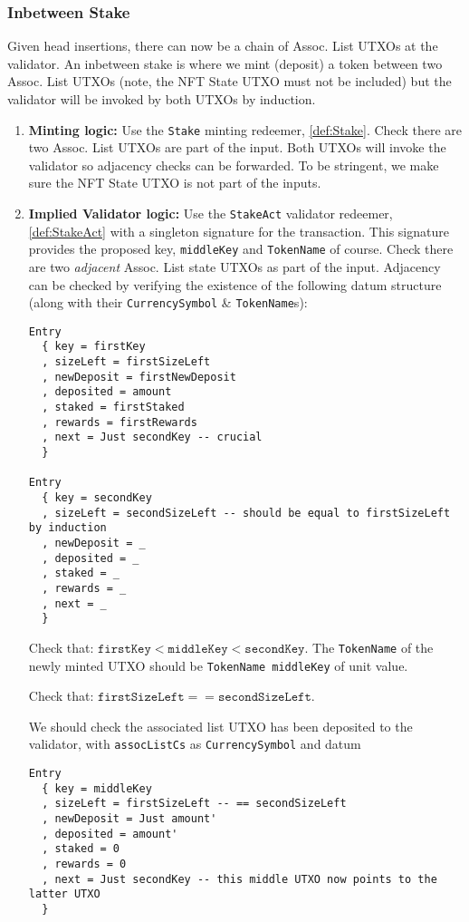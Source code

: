 \documentclass[10pt, a4paper]{article}
\theoremstyle{definition}
\begin{document}
\subsubsection{Inbetween Stake}\label{subsubsection:InbetweenStake}
Given head insertions, there can now be a chain of Assoc. List  UTXOs at the validator. An inbetween stake is where we mint (deposit) a token between two Assoc. List UTXOs (note, the NFT State UTXO must not be included) but the validator will be invoked by both UTXOs by induction.
\begin{enumerate}
\item{\textbf{Minting logic:} Use the \texttt{Stake} minting redeemer, \ref{def:Stake}. Check there are two Assoc. List UTXOs are part of the input. Both UTXOs will invoke the validator so adjacency checks can be forwarded. To be stringent, we make sure the NFT State UTXO is not part of the inputs.
}

\item{\textbf{Implied Validator logic:} Use the \texttt{StakeAct} validator redeemer, \ref{def:StakeAct} with a singleton signature for the transaction. This signature provides the proposed key, \texttt{middleKey} and \texttt{TokenName} of course. Check there are two \textit{adjacent} Assoc. List state UTXOs as part of the input. Adjacency can be checked by verifying the existence of the following datum structure (along with their \texttt{CurrencySymbol} \& \texttt{TokenName}s):
\begin{verbatim}
Entry
  { key = firstKey
  , sizeLeft = firstSizeLeft
  , newDeposit = firstNewDeposit
  , deposited = amount
  , staked = firstStaked 
  , rewards = firstRewards 
  , next = Just secondKey -- crucial
  }

Entry
  { key = secondKey
  , sizeLeft = secondSizeLeft -- should be equal to firstSizeLeft by induction
  , newDeposit = _
  , deposited = _
  , staked = _ 
  , rewards = _
  , next = _
  }
\end{verbatim}

Check that:  $\texttt{firstKey} < \texttt{middleKey} < \texttt{secondKey}.$ The \texttt{TokenName} of the newly minted UTXO should be \texttt{TokenName middleKey} of unit value.

Check that: $\texttt{firstSizeLeft} == \texttt{secondSizeLeft}$.

 We should check the associated list UTXO has been deposited to the validator, with \texttt{assocListCs} as \texttt{CurrencySymbol} and datum
\begin{verbatim}
Entry
  { key = middleKey
  , sizeLeft = firstSizeLeft -- == secondSizeLeft
  , newDeposit = Just amount'
  , deposited = amount'
  , staked = 0 
  , rewards = 0
  , next = Just secondKey -- this middle UTXO now points to the latter UTXO
  }
\end{verbatim}

}
\end{enumerate}
\end{document}
